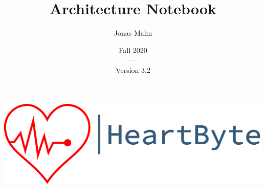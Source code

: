 \documentclass{article}
\title{Architecture Notebook}
\author{Jonas Malm}
\date{Fall 2020\\---\\Version 3.2}
\begin{document}
\maketitle

\begin{centering}
\includegraphics[scale=0.7]{logo-heartbyte}
\end{centering}

\clearpage
\end{document}
